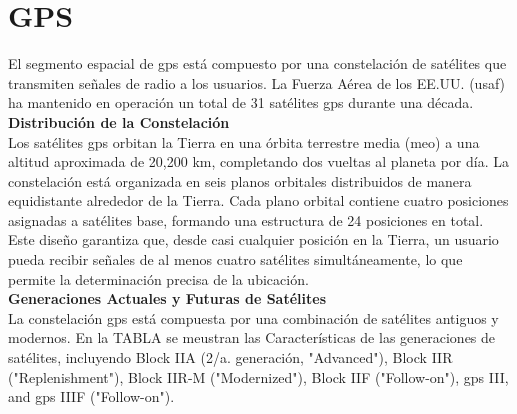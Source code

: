 \section{\fontsize{12}{18}\selectfont GPS}

\renewcommand{\thetable}{2}

\begin{justify}
    El segmento espacial de \gls{gps} está compuesto por una constelación de satélites que transmiten señales de radio a los usuarios.
    La Fuerza Aérea de los EE.UU. (\gls{usaf}) ha mantenido en operación un total de 31 satélites \gls{gps} durante una década.\\

    \textbf{Distribución de la Constelación}\\
    Los satélites \gls{gps} orbitan la Tierra en una órbita terrestre media (\gls{meo}) a una altitud aproximada de 20,200 km, completando
    dos vueltas al planeta por día. La constelación está organizada en seis planos orbitales distribuidos de manera equidistante alrededor
    de la Tierra. Cada plano orbital contiene cuatro posiciones asignadas a satélites base, formando una estructura de 24 posiciones en total.
    Este diseño garantiza que, desde casi cualquier posición en la Tierra, un usuario pueda recibir señales de al menos cuatro satélites simultáneamente,
    lo que permite la determinación precisa de la ubicación.\\

    \textbf{Generaciones Actuales y Futuras de Satélites}\\
    La constelación \gls{gps} está compuesta por una combinación de satélites antiguos y modernos. En la TABLA se meustran las Características de las
    generaciones de satélites, incluyendo Block IIA (2/a. generación, "Advanced"), Block IIR ("Replenishment"), Block IIR-M ("Modernized"), Block IIF ("Follow-on"),
    \gls{gps} III, and \gls{gps} IIIF ("Follow-on").
\end{justify}

